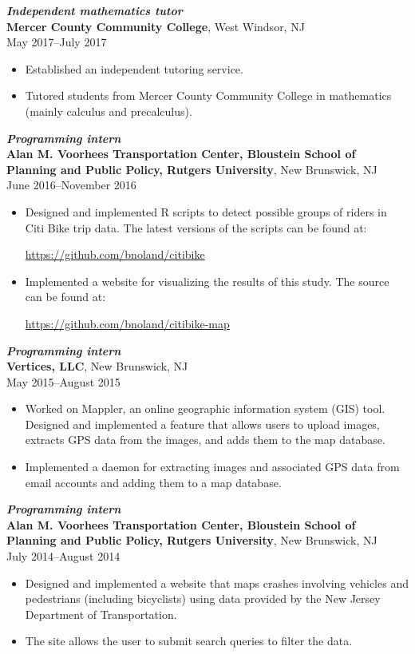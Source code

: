 \documentclass[letterpaper,12pt]{article}
\begin{document}
\textit{\textbf{Independent mathematics tutor}} \\
\textbf{Mercer County Community College},
West Windsor, NJ \\
May 2017--July 2017
\begin{itemize}
\item Established an independent tutoring service.
\item Tutored students from Mercer County Community College in
  mathematics (mainly calculus and precalculus).
\end{itemize}

\textit{\textbf{Programming intern}} \\
\textbf{Alan M. Voorhees Transportation Center, Bloustein School of
  Planning and Public Policy, Rutgers University},
New Brunswick, NJ \\
June 2016--November 2016
\begin{itemize}
\item Designed and implemented R scripts to detect possible groups of
  riders in Citi Bike trip data. The latest versions of the scripts
  can be found at:
  \begin{center}
    \url{https://github.com/bnoland/citibike}
  \end{center}

\item Implemented a website for visualizing the results of this
  study. The source can be found at:
  \begin{center}
    \url{https://github.com/bnoland/citibike-map}
  \end{center}

\end{itemize}

\textit{\textbf{Programming intern}} \\
\textbf{Vertices, LLC}, New Brunswick, NJ \\
May 2015--August 2015
\begin{itemize}
\item Worked on Mappler, an online geographic information system (GIS)
  tool. Designed and implemented a feature that allows users to upload
  images, extracts GPS data from the images, and adds them to the map
  database.
\item Implemented a daemon for extracting images and associated GPS
  data from email accounts and adding them to a map database.
\end{itemize}

\textit{\textbf{Programming intern}} \\
\textbf{Alan M. Voorhees Transportation Center, Bloustein School of
  Planning and Public Policy, Rutgers University},
New Brunswick, NJ \\
July 2014--August 2014
\begin{itemize}
\item Designed and implemented a website that maps crashes involving
  vehicles and pedestrians (including bicyclists) using data provided
  by the New Jersey Department of Transportation.
\item The site allows the user to submit search queries to filter the
  data.
\end{itemize}
\end{document}
